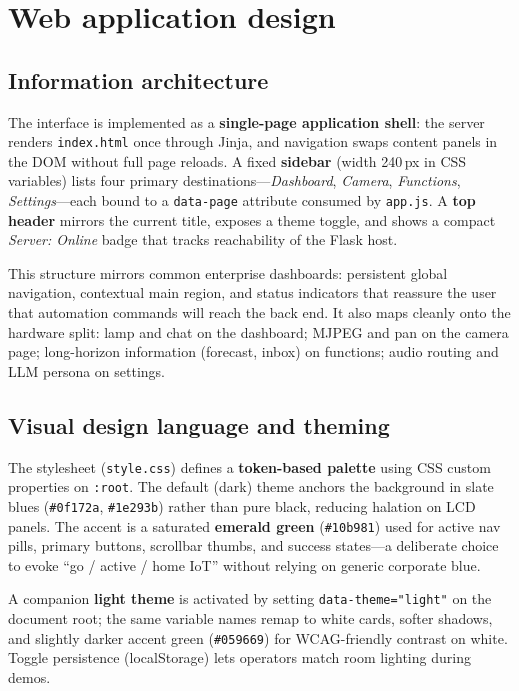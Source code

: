 \documentclass[12pt,a4paper]{report}
\begin{document}
\section{Web application design}

\subsection{Information architecture}

The interface is implemented as a \textbf{single-page application shell}: the server renders \texttt{index.html} once through Jinja, and navigation swaps content panels in the DOM without full page reloads. A fixed \textbf{sidebar} (width 240\,px in CSS variables) lists four primary destinations---\textit{Dashboard}, \textit{Camera}, \textit{Functions}, \textit{Settings}---each bound to a \texttt{data-page} attribute consumed by \texttt{app.js}. A \textbf{top header} mirrors the current title, exposes a theme toggle, and shows a compact \textit{Server: Online} badge that tracks reachability of the Flask host.

This structure mirrors common enterprise dashboards: persistent global navigation, contextual main region, and status indicators that reassure the user that automation commands will reach the back end. It also maps cleanly onto the hardware split: lamp and chat on the dashboard; MJPEG and pan on the camera page; long-horizon information (forecast, inbox) on functions; audio routing and LLM persona on settings.

\subsection{Visual design language and theming}

The stylesheet (\texttt{style.css}) defines a \textbf{token-based palette} using CSS custom properties on \texttt{:root}. The default (dark) theme anchors the background in slate blues (\texttt{\#0f172a}, \texttt{\#1e293b}) rather than pure black, reducing halation on LCD panels. The accent is a saturated \textbf{emerald green} (\texttt{\#10b981}) used for active nav pills, primary buttons, scrollbar thumbs, and success states---a deliberate choice to evoke ``go / active / home IoT'' without relying on generic corporate blue.

A companion \textbf{light theme} is activated by setting \texttt{data-theme="light"} on the document root; the same variable names remap to white cards, softer shadows, and slightly darker accent green (\texttt{\#059669}) for WCAG-friendly contrast on white. Toggle persistence (localStorage) lets operators match room lighting during demos.
\end{document}

